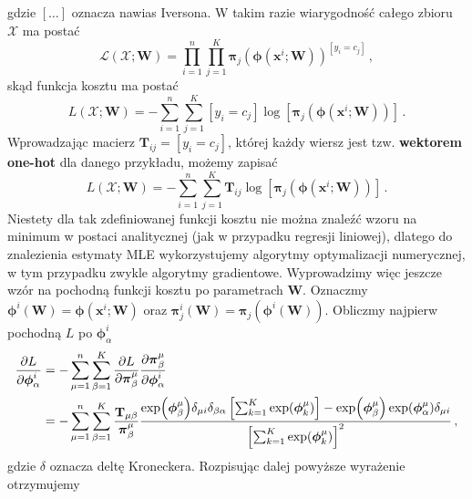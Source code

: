 \documentclass{myclass}
\numberwithin{equation}{section}
\begin{document}
gdzie \([\ldots]\) oznacza nawias Iversona. W takim razie wiarygodność całego zbioru \(\mathcal{X}\)
ma postać
\begin{equation}
    \mathcal{L}(\mathcal{X}; \mathbf{W}) = \prod_{i=1}^n \prod_{j=1}^K \boldsymbol{\pi}_j\left(\boldsymbol{\phi}(\mathbf{x}^i; \mathbf{W})\right)^{[y_i = c_j]}\,,
\end{equation}
skąd funkcja kosztu ma postać
\begin{equation}
    L(\mathcal{X}; \mathbf{W}) = - \sum_{i=1}^n \sum_{j=1}^K [y_i = c_j] \log \left[ \boldsymbol{\pi}_j\left(\boldsymbol{\phi}(\mathbf{x}^i; \mathbf{W})\right)\right]\,.
\end{equation}
Wprowadzając macierz \(\mathbf{T}_{ij} = [y_i = c_j]\), której każdy wiersz jest tzw.
\textbf{wektorem one-hot} dla danego przykładu, możemy zapisać
\begin{equation}\boxed{
    L(\mathcal{X}; \mathbf{W}) = - \sum_{i=1}^n \sum_{j=1}^K \mathbf{T}_{ij} \log \left[ \boldsymbol{\pi}_j\left(\boldsymbol{\phi}(\mathbf{x}^i; \mathbf{W})\right)\right]\,.
}\end{equation}
Niestety dla tak zdefiniowanej funkcji kosztu nie można znaleźć wzoru na minimum w postaci
analitycznej (jak w przypadku regresji liniowej), dlatego do znalezienia estymaty MLE wykorzystujemy
algorytmy optymalizacji numerycznej, w tym przypadku zwykle algorytmy gradientowe. Wyprowadzimy więc
jeszcze wzór na pochodną funkcji kosztu po parametrach \(\mathbf{W}\). Oznaczmy
\(\boldsymbol{\phi}^i(\mathbf{W}) = \boldsymbol{\phi}(\mathbf{x}^i; \mathbf{W})\) oraz
\(\boldsymbol{\pi}_j^i(\mathbf{W}) = \boldsymbol{\pi}_j(\boldsymbol{\phi}^i(\mathbf{W}))\). Obliczmy
najpierw pochodną \(L\) po \(\boldsymbol{\phi}^i_\alpha\)
\begin{equation}
    \begin{split}
        \pdv{L}{\boldsymbol{\phi}^i_\alpha} &= -\sum_{\mu=1}^n\sum_{\beta=1}^K \pdv{L}{\boldsymbol{\pi}_\beta^\mu}\pdv{\boldsymbol{\pi}_\beta^\mu}{\boldsymbol{\phi}^i_\alpha}\\
        &= -\sum_{\mu=1}^n\sum_{\beta=1}^K \frac{\mathbf{T}_{\mu\beta}}{\boldsymbol{\pi}_\beta^\mu} \frac{\exp(\boldsymbol{\phi}_\beta^\mu)\delta_{\mu i}\delta_{\beta \alpha} \left[\sum_{k=1}^K \exp(\boldsymbol{\phi}_k^\mu)\right] - \exp(\boldsymbol{\phi}_\beta^\mu) \exp(\boldsymbol{\phi}^\mu_\alpha) \delta_{\mu i}}{\left[\sum_{k=1}^K \exp(\boldsymbol{\phi}_k^\mu)\right]^2}\,,
    \end{split}
\end{equation}
gdzie \(\delta\) oznacza deltę Kroneckera. Rozpisując dalej powyższe wyrażenie otrzymujemy
\end{document}
